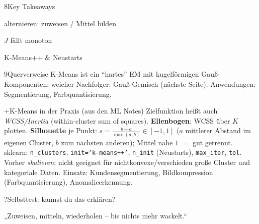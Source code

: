 \begin{hngrid}
\begin{hnp}[raster multicolumn=2,acc=hnorange]{8}{Key Takeaways}
\begin{hnchk}
\item alternieren: zuweisen / Mittel bilden
\item $J$ fällt monoton
\item K-Means++ \& Neustarts
\end{hnchk}
\end{hnp}
%
\begin{hnp}[raster multicolumn=2,acc=hnrose]{9}{Querverweise}
K-Means ist ein ``hartes'' EM mit kugelförmigen Gauß-Komponenten; weicher Nachfolger: Gauß-Gemisch (nächste Seite). Anwendungen: Segmentierung, Farbquantisierung.
\end{hnp}
%
\begin{hnp}[raster multicolumn=6,acc=hnteal]{+}{K-Means in der Praxis (aus den ML Notes)}
Zielfunktion heißt auch \emph{WCSS/Inertia} (within-cluster sum of squares). \textbf{Ellenbogen}: WCSS über $K$ plotten. \textbf{Silhouette} je Punkt: $s=\frac{b-a}{\max(a,b)}\in[-1,1]$ ($a$ mittlerer Abstand im eigenen Cluster, $b$ zum nächsten anderen); Mittel nahe $1$ $=$ gut getrennt. sklearn: \texttt{n\_clusters}, \texttt{init=`k-means++'}, \texttt{n\_init} (Neustarts), \texttt{max\_iter}, \texttt{tol}. Vorher \emph{skalieren}; nicht geeignet für nichtkonvexe/verschieden große Cluster und kategoriale Daten. Einsatz: Kundensegmentierung, Bildkompression (Farbquantisierung), Anomalieerkennung.
\end{hnp}
%
\begin{hnp}[raster multicolumn=6,acc=hnpurple,colback=hnlilac!30]{?}{Selbsttest: kannst du das erklären?}
\end{hnp}
%
\begin{hnbanner}[raster multicolumn=6]
„Zuweisen, mitteln, wiederholen -- bis nichts mehr wackelt.“
\end{hnbanner}
\end{hngrid}
